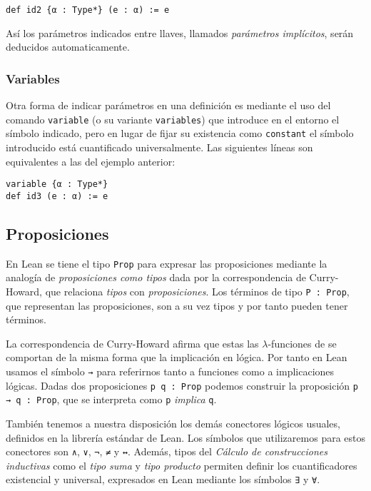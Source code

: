 \begin{lstlisting}
def id2 {α : Type*} (e : α) := e
\end{lstlisting}

Así los parámetros indicados entre llaves, llamados \textit{parámetros
	implícitos}, serán deducidos automaticamente.

\subsubsection*{Variables}%

Otra forma de indicar parámetros en una definición es mediante el uso del
comando \lstinline{variable} (o su variante \lstinline{variables}) que introduce
en el entorno el símbolo indicado, pero en lugar de fijar su existencia como
\lstinline{constant} el símbolo introducido está \guillemotleft cuantificado
universalmente\guillemotright. Las siguientes líneas son equivalentes a las del
ejemplo anterior:

\begin{lstlisting}
variable {α : Type*}
def id3 (e : α) := e
\end{lstlisting}

\subsection{Proposiciones}

En Lean se tiene el tipo \lstinline{Prop} para expresar las
proposiciones mediante la analogía de \textit{proposiciones como tipos} dada por
la correspondencia de Curry-Howard, que relaciona \textit{tipos} con
\textit{proposiciones}. Los términos de tipo \lstinline{P : Prop}, que representan las
proposiciones, son a su vez tipos y por tanto pueden tener términos.

La correspondencia de Curry-Howard afirma que estas las $\lambda$-funciones de
se comportan de la misma forma que la implicación en lógica.
Por tanto en Lean usamos el símbolo \lstinline{→} para referirnos tanto a
funciones como a implicaciones lógicas. Dadas dos
proposiciones \lstinline{p q : Prop} podemos construir la proposición
\lstinline{p → q : Prop}, que se interpreta como \lstinline{p} \textit{implica}
\lstinline{q}.


También tenemos a nuestra disposición los demás conectores lógicos usuales,
definidos en la librería estándar de Lean. Los símbolos que
utilizaremos para estos conectores son \lstinline{∧}, \lstinline{∨},
\lstinline{¬}, \lstinline{≠} y \lstinline{↔}. Además, tipos del \textit{Cálculo
de construcciones inductivas} como el \textit{tipo suma} y \textit{tipo
	producto} permiten definir los cuantificadores existencial y universal,
expresados en Lean mediante los símbolos \lstinline{∃} y \lstinline{∀}.

